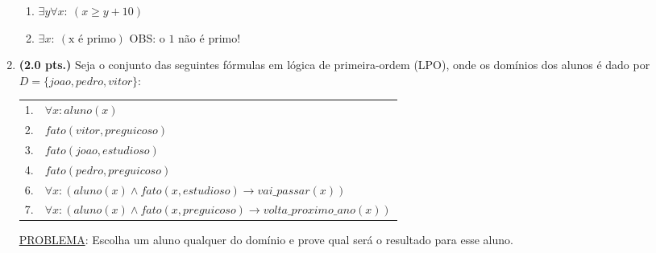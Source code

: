 \documentclass[a4paper,11pt]{article}
\begin{document}
\begin{enumerate}
\begin{enumerate}

       \item $\exists y \forall x: ~ (x  \geq y + 10)$
       
     \item $\exists x: ~ (\text{x é primo})$ \hspace{1cm} OBS: o $1$ não é primo!
 \end{enumerate} 
\item \label{P1} {\bf (2.0 pts.)} Seja o conjunto das seguintes fórmulas em lógica de primeira-ordem (LPO), onde os domínios dos alunos é dado por $D =\{joao, pedro, vitor\}$:\\
\begin{tabular}{ll}
\\  \hline \hline
  1. & $\forall x:  aluno(x) $ \\
  2. & $fato(vitor, preguicoso)$ \\
  3. & $fato(joao, estudioso)$ \\
  4. & $fato(pedro, preguicoso)$ \\
  6. & $\forall x : (aluno(x) \wedge fato(x, estudioso) \rightarrow vai\_passar(x) )$ \\
  7. & $\forall x : (aluno(x) \wedge fato(x, preguicoso) \rightarrow volta\_proximo\_ano(x) )$ \\
    \hline \hline
 \end{tabular}

\vskip 0.2cm
\underline{PROBLEMA}: Escolha um aluno qualquer do domínio e prove qual será o resultado para esse aluno.


\end{enumerate}
\end{document}
